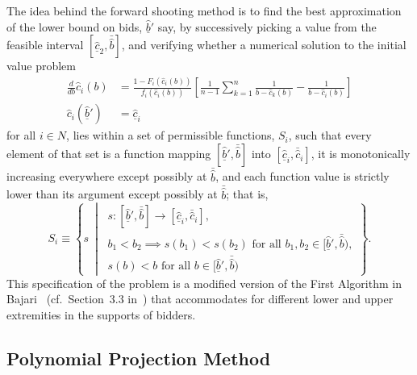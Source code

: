 The idea behind the forward shooting method is to find the best approximation of the lower bound on bids, $\underline{\hat{b}}'$ say, by successively picking a value from the feasible interval $[\underline{\hat{c}}_2, \bar{\hat{b}}]$, and verifying whether a numerical solution to the initial value problem
\begin{equation}
  \label{eq:fsm_initial_value_problem_indirect}
  \begin{array}{ll}
    \displaystyle\frac{d}{db}\hat{c}_i(b) &= \displaystyle\frac{1 - F_i(\hat{c}_i(b))}{f_i(\hat{c}_i(b))}\left[ \frac{1}{n-1}\sum_{k=1}^n\frac{1}{b - \hat{c}_k(b)} - \frac{1}{b - \hat{c}_i(b)} \right] \\[2ex]
    \hat{c}_i(\underline{\hat{b}}') &= \underline{\hat{c}}_i
  \end{array}
\end{equation}
for all $i\in N$, lies within a set of permissible functions, $S_i$, such that every element of that set is a function mapping $[\underline{\hat{b}}', \bar{\hat{b}}]$ into $[\underline{\hat{c}}_i, \bar{\hat{c}}_i]$, it is monotonically increasing everywhere except possibly at $\bar{\hat{b}}$, and each function value is strictly lower than its argument except possibly at $\bar{\hat{b}}$; that is,
\begin{equation*}
  S_i\equiv\left\{s \:\middle\vert\:
  \begin{array}{l}
    s: [\underline{\hat{b}}', \bar{\hat{b}}]\to [\underline{\hat{c}}_i, \bar{\hat{c}}_i],\\
    b_1 < b_2\implies s(b_1) < s(b_2) \text{ for all }b_1,b_2\in [\underline{\hat{b}}', \bar{\hat{b}}),\\
    s(b) < b \text{ for all }b\in [\underline{\hat{b}}', \bar{\hat{b}})
  \end{array}
  \right\}.
\end{equation*}
This specification of the problem is a modified version of the First Algorithm in Bajari~\cite{Bajari2001a} (cf.~Section~3.3 in~\cite{Bajari2001a}) that accommodates for different lower and upper extremities in the supports of bidders.

\subsection{Polynomial Projection Method} %
\label{sub:polynomial_projection_method_indirect}



